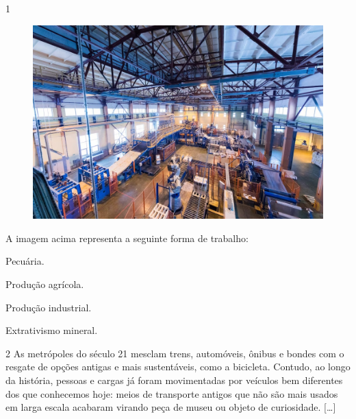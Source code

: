 
\pagebreak
{}

\num{1}

\begin{figure}[htpb!]
\includegraphics[width=.5\textwidth]{./imgs/img64.png}
\end{figure}

A imagem acima representa a seguinte forma de trabalho:

\begin{minipage}{0.5\textwidth}
\begin{escolha}
\item Pecuária.

\item Produção agrícola.

\item Produção industrial.

\item Extrativismo mineral.
\end{escolha}
\end{minipage}


\num{2} As metrópoles do século 21 mesclam trens, automóveis, ônibus e bondes
com o resgate de opções antigas e mais sustentáveis, como a bicicleta.
Contudo, ao longo da história, pessoas e cargas já foram movimentadas
por veículos bem diferentes dos que conhecemos hoje: meios de transporte
antigos que não são mais usados em larga escala acabaram virando peça de
museu ou objeto de curiosidade. {[}\ldots{}{]}

